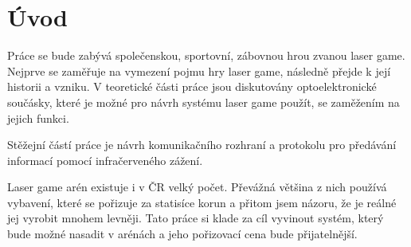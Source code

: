 \chapter*{Úvod}
{}


Práce se bude zabývá společenskou, sportovní, zábovnou hrou zvanou laser game. Nejprve se zaměřuje na vymezení pojmu hry laser game, následně přejde k její historii a vzniku. V teoretické části práce jsou diskutovány optoelektronické součásky, které je možné pro návrh systému laser game použít, se zaměžením na jejich funkci.

Stěžejní částí práce je návrh komunikačního rozhraní a protokolu pro předávání informací pomocí infračerveného zážení.

Laser game arén existuje i v ČR velký počet. Převážná většina z nich používá vybavení, které se pořizuje za statisíce korun a přitom jsem názoru, že je reálné jej vyrobit mnohem levněji. Tato práce si klade za cíl vyvinout systém, který bude možné nasadit v arénách a jeho pořizovací cena bude přijatelnější.
